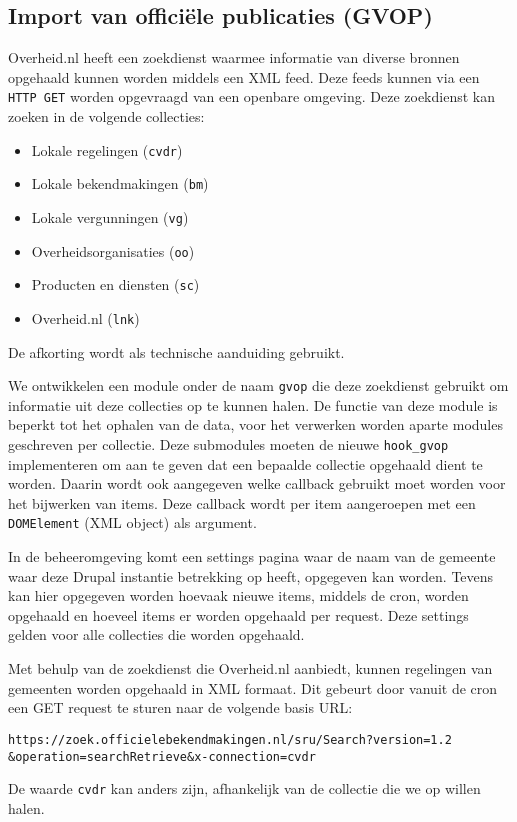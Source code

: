 \subsection{Import van offici\"{e}le publicaties (GVOP)}

Overheid.nl heeft een zoekdienst waarmee informatie van diverse bronnen opgehaald kunnen worden middels een XML feed. Deze feeds kunnen via een \texttt{HTTP GET} worden opgevraagd van een openbare omgeving. Deze zoekdienst kan zoeken in de volgende collecties:
\begin{itemize}
\item Lokale regelingen (\texttt{cvdr})
\item Lokale bekendmakingen (\texttt{bm})
\item Lokale vergunningen (\texttt{vg})
\item Overheidsorganisaties (\texttt{oo})
\item Producten en diensten (\texttt{sc})
\item Overheid.nl (\texttt{lnk})
\end{itemize}
De afkorting wordt als technische aanduiding gebruikt.

We ontwikkelen een module onder de naam \texttt{gvop} die deze zoekdienst gebruikt om informatie uit deze collecties op te kunnen halen. De functie van deze module is beperkt tot het ophalen van de data, voor het verwerken worden aparte modules geschreven per collectie. Deze submodules moeten de nieuwe \texttt{hook\_gvop} implementeren om aan te geven dat een bepaalde collectie opgehaald dient te worden. Daarin wordt ook aangegeven welke callback gebruikt moet worden voor het bijwerken van items. Deze callback wordt per item aangeroepen met een \texttt{DOMElement} (XML object) als argument.

In de beheeromgeving komt een settings pagina waar de naam van de gemeente waar deze Drupal instantie betrekking op heeft, opgegeven kan worden. Tevens kan hier opgegeven worden hoevaak nieuwe items, middels de cron, worden opgehaald en hoeveel items er worden opgehaald per request. Deze settings gelden voor alle collecties die worden opgehaald.

Met behulp van de zoekdienst die Overheid.nl aanbiedt, kunnen regelingen van gemeenten worden opgehaald in XML formaat. Dit gebeurt door vanuit de cron een GET request te sturen naar de volgende basis URL:

\begin{verbatim}
https://zoek.officielebekendmakingen.nl/sru/Search?version=1.2
&operation=searchRetrieve&x-connection=cvdr
\end{verbatim}
De waarde \texttt{cvdr} kan anders zijn, afhankelijk van de collectie die we op willen halen.

